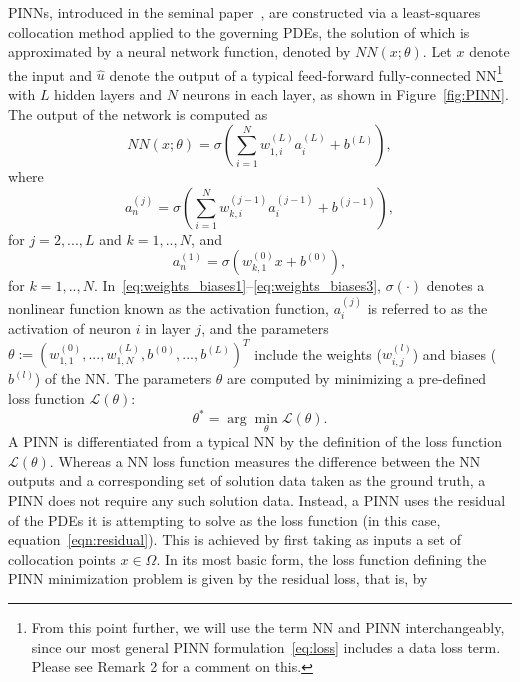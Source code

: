 \documentclass[oneside,final]{csri23}
\begin{document}
PINNs, introduced in the seminal paper~\cite{WDS:Raissi2019}, are constructed via a least-squares collocation method applied to the governing PDEs, the solution of which is approximated by a neural network function, denoted by $NN(x; \theta)$. Let $x$ denote the input and $\hat{u}$ denote the output of a typical feed-forward fully-connected NN\footnote{From this point further, we will use the term NN and PINN interchangeably, since our most general PINN formulation~\eqref{eq:loss} includes a data loss term.  Please see Remark 2 for a comment on this.} with $L$ hidden layers and $N$ neurons in each layer, as shown in Figure~\ref{fig:PINN}. The output of the network is computed as
\begin{equation} \label{eq:weights_biases1}
    NN(x ; \theta) = \sigma \left(\sum_{i=1}^N w_{1,i}^{(L)} a_i^{(L)} + b^{(L)} \right), 
\end{equation}
where
\begin{equation} \label{eq:weights_biases2}
    a_n^{(j)} = \sigma\left(\sum_{i=1}^N w_{k,i}^{(j-1)} a_i^{(j-1)} + b^{(j-1)} \right),
\end{equation}
for $j = 2, ..., L$ and $k = 1, .., N$, and 
\begin{equation} \label{eq:weights_biases3}
    a_n^{(1)} = \sigma\left(w_{k,1}^{(0)}x + b^{(0)} \right),
\end{equation}
for $k = 1, .., N$. In~\eqref{eq:weights_biases1}--\eqref{eq:weights_biases3}, $\sigma(\cdot)$ denotes a nonlinear function known as the activation function, $a_i^{(j)}$ is referred to as the activation of neuron $i$ in layer $j$, and the parameters $\theta := \left( w_{1,1}^{(0)}, ..., w_{1,N}^{(L)}, b^{(0)}, ..., b^{(L)} \right)^T$ include the weights ($w_{i,j}^{(l)}$) and biases ($b^{(l)}$) of the NN. The parameters $\theta$ are computed by minimizing a pre-defined loss function $\mathcal{L}(\theta)$:
\begin{equation} \label{eq:min}
    \theta^* = \arg\min_{\theta} \mathcal{L}(\theta).
\end{equation}
A PINN is differentiated from a typical NN by the definition of the loss function $\mathcal{L}(\theta)$. Whereas a NN loss function measures the difference between the NN outputs and a corresponding set of solution data taken as the ground truth, a PINN does not require any such solution data. Instead, a PINN uses the residual of the PDEs it is attempting to solve as the loss function (in this case, equation~\eqref{eqn:residual}). This is achieved by first taking as inputs a set of collocation points $x\in \Omega$. In its most basic form, the loss function defining the PINN minimization problem is given by the residual loss, that is, by 
\end{document}
